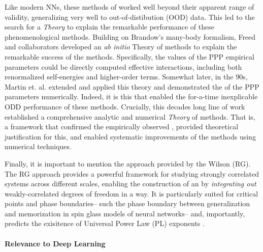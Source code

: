 Like modern NNs, these \SemiEmpirical methods of \QuantumChemistry
worked well beyond their apparent range of validity,
generalizing very well to out-of-distibution (OOD) data.  This led to the
search for a \SemiEmpirical \emph{Theory} to explain the
remarkable performance of these phenomenological methods.
Building on Brandow’s many-body formalism, Freed and collaborators
\cite{freed1977, Freed1983}
developed an \emph{ab initio} \EffectiveHamiltonian
Theory of \SemiEmpirical methods  to explain the remarkable success of the \SemiEmpirical methods.
Specifically, the values of the PPP empirical parameters could be directly computed
effective interactions, including both renormalized self-energies and higher-order terms.
 Somewhat later, in the 90s,
 Martin et. al.\cite{MartinFreed1996, Martin1996, Martin1996_CPL, Martin1998}
 extended and applied this \EffectiveHamiltonian theory
 and demonstrated  the \Universality of the \SemiEmpirical PPP parameters numerically.
 Indeed, it is this \Universality that enabled the for-a-time inexplicable
 ODD performance of these methods.
 Crucially, this decades long line of work established a comprehensive
 analytic and numerical \emph{Theory} of \SemiEmpirical methods.
 That is, a framework that confirmed the empirically observed \Universality,
 provided theoretical justification for this,
 and  enabled systematic improvements of the methods using numerical techniques.

 Finally, it is important to mention the \EffectiveHamiltonian approach provided by the Wilson \emph{\RenormalizationGroup} (RG).\cite{NobelPrizeRG}
 The RG approach provides a powerful framework for studying strongly correlated systems across different scales,
 enabling the construction of an \EffectiveHamiltonian by \emph{integrating out} weakly-correlated degrees of freedom  in a \ScaleInvariant way.
 It is particularly suited for critical points and phase boundaries--
 such the phase boundary between generalization and memorization in spin glass models of neural networks--
 and, importantly,
 predicts the  exisitence of Universal Power Law (PL) exponents .
 
 \paragraph{Relevance to Deep Learning}
 
